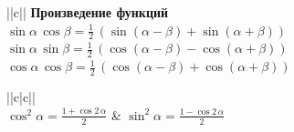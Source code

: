 \begin{tabu}[t]{||c||}
	\hline
		\textbf{Произведение функций} \\
	\hline
	\hline
		$\displaystyle \sin \alpha\, \cos \beta = \frac{1}{2}\, (\sin (\alpha - \beta) + \sin (\alpha + \beta)) $ \\
	\hline
		$\displaystyle \sin \alpha\, \sin \beta = \frac{1}{2}\, (\cos (\alpha - \beta) - \cos (\alpha + \beta)) $ \\
	\hline
		$\displaystyle \cos \alpha\, \cos \beta = \frac{1}{2}\, (\cos (\alpha - \beta) + \cos (\alpha + \beta)) $ \\
	\hline
\end{tabu}
\begin{tabu}[t]{||c|c||}
	\hline
		 \\
	\hline
	\hline
		$\displaystyle \cos^2 \alpha = \frac{1 + \cos 2\, \alpha}{2} $ &
		$\displaystyle \sin^2 \alpha = \frac{1 - \cos 2\, \alpha}{2} $ \\
	\hline
		 \\
	\hline
		 \\
	\hline
		 \\
	\hline
\end{tabu}
